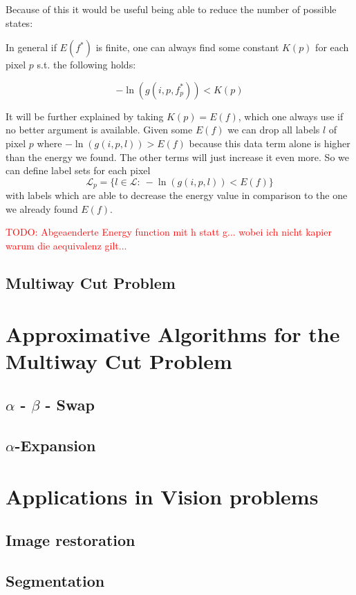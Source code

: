 \documentclass{scrartcl}[12pt, halfparskip]
\newcommand{\todo}[1]{\textcolor{red}{TODO: #1}}
\begin{document}
Because of this it would be useful being able to reduce the number of possible states:

In general if $E(f^*)$ is finite, one can always find some constant $K(p)$ for each pixel $p$ s.t. the following holds:

\begin{equation}
	- \ln(g(i, p, f_p^*)) < K(p)
\end{equation}

It will be further explained by taking $K(p) = E(f)$, which one always use if no better argument is available. Given some $E(f)$ we can drop all labels $l$ of pixel $p$ where $- \ln(g(i, p, l)) > E(f)$ because this data term alone is higher than the energy we found. The other terms will just increase it even more. So we can define label sets for each pixel
\begin{equation}
	\mathcal{L}_p = \{l \in \mathcal{L}: \ - \ln(g(i, p, l)) < E(f) \}
\end{equation}
with labels which are able to decrease the energy value in comparison to the one we already found $E(f)$.

\todo{Abgeaenderte Energy function mit h statt g... wobei ich nicht kapier warum die aequivalenz gilt...}


\subsection{Multiway Cut Problem}

\section{Approximative Algorithms for the Multiway Cut Problem}
\subsection{$\alpha$ - $\beta$ - Swap}
\subsection{$\alpha$-Expansion}

\section{Applications in Vision problems}
\subsection{Image restoration}
\subsection{Segmentation}
\end{document}
